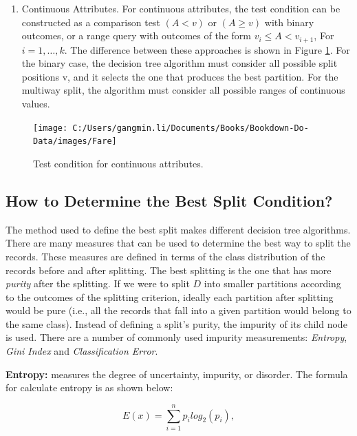 \documentclass[
]{book}
\providecommand{\tightlist}{%
  \setlength{\itemsep}{0pt}\setlength{\parskip}{0pt}}
\begin{document}
\begin{enumerate}
\def\labelenumi{\arabic{enumi}.}
\setcounter{enumi}{2}
\tightlist
\item
  Continuous Attributes. For continuous attributes, the test condition can be constructed as a comparison test \((A<v)\) or \((A≥v)\) with binary outcomes, or a range query with outcomes of the form \(v_i≤A<v_{i+1}\), For \(i=1,…,k\). The difference between these approaches is shown in Figure \ref{fig:fare}. For the binary case, the decision tree algorithm must consider all possible split positions v, and it selects the one that produces the best partition. For the multiway split, the algorithm must consider all possible ranges of continuous values.
\end{enumerate}

\begin{figure}

{\centering \texttt{[image: C:/Users/gangmin.li/Documents/Books/Bookdown-Do-Data/images/Fare]} 

}

\caption{Test condition for continuous attributes.}\label{fig:fare}
\end{figure}

\hypertarget{best_split}{%
\subsection*{How to Determine the Best Split Condition?}\label{best_split}}


The method used to define the best split makes different decision tree algorithms. There are many measures that can be used to determine the best way to split the records. These measures are defined in terms of the class distribution of the records before and after splitting. The best splitting is the one that has more \emph{purity} after the splitting. If we were to split \(D\) into smaller partitions according to the outcomes of the splitting criterion, ideally each partition after splitting would be pure (i.e., all the records that fall into a given partition would belong to the same class). Instead of defining a split's purity, the impurity of its child node is used. There are a number of commonly used impurity measurements: \emph{Entropy}, \emph{Gini Index} and \emph{Classification Error}.

\textbf{Entropy:} measures the degree of uncertainty, impurity, or disorder. The formula for calculate entropy is as shown below:

\begin{equation} 
E(x)= ∑_{i=1}^{n}p_ilog_2(p_i),
  \label{eq:entropy}
\end{equation}
\end{document}

